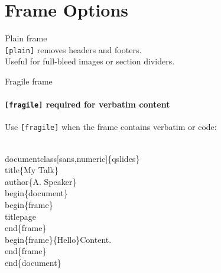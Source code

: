 \documentclass[sans,numeric,titlesplit]{qslides}
\begin{document}

\section{Frame Options}

\begin{frame}[plain]{}
  \vfill
  \begin{center}
    {\Large\textcolor{fg_head_col}{Plain frame}}\\[2ex]
    \texttt{[plain]} removes headers and footers.\\
    Useful for full-bleed images or section dividers.
  \end{center}
  \vfill
\end{frame}

\begin{frame}[fragile]{Fragile frame}
  \framesubtitle{\texttt{[fragile]} required for verbatim content}
  Use \texttt{[fragile]} when the frame contains verbatim or code:
  \begin{semiverbatim}
    \\documentclass[sans,numeric]\{qslides\}
    \\title\{My Talk\}
    \\author\{A. Speaker\}
    \\begin\{document\}
    \\begin\{frame\}\\titlepage\\end\{frame\}
    \\begin\{frame\}\{Hello\}Content.\\end\{frame\}
    \\end\{document\}
  \end{semiverbatim}
\end{frame}
\end{document}
